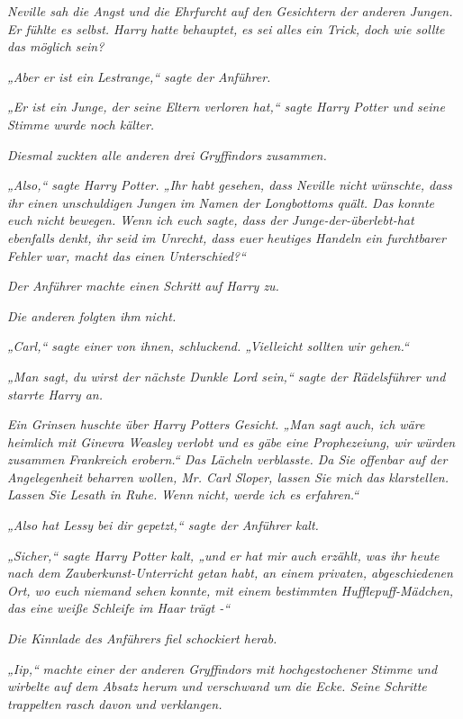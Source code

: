 {\emph{Neville sah die Angst und die Ehrfurcht auf den Gesichtern der anderen Jungen. Er fühlte es selbst. Harry hatte} \emph{\emph{behauptet,}} \emph{es sei alles ein Trick, doch wie sollte das möglich sein?}

\emph{„Aber er ist ein} \emph{\emph{Lestrange,}“ sagte der Anführer.}

\emph{„Er ist ein Junge, der} \emph{\emph{seine Eltern verloren hat,}“ sagte Harry Potter und seine} \emph{Stimme wurde noch kälter.}

\emph{Diesmal zuckten alle anderen drei Gryffindors zusammen.}

\emph{„Also,“ sagte Harry Potter. „Ihr habt gesehen, dass Neville nicht wünschte, dass ihr einen unschuldigen Jungen im Namen der Longbottoms quält. Das konnte euch nicht bewegen. Wenn ich euch sagte, dass der Junge-der-überlebt-hat} \emph{\emph{ebenfalls}} \emph{denkt, ihr} \emph{seid} \emph{im Unrecht, dass euer heutiges Handeln ein furchtbarer Fehler war, macht das einen Unterschied?“}

\emph{Der Anführer machte einen Schritt auf Harry zu.}

\emph{Die anderen folgten ihm} \emph{\emph{nicht.}}

\emph{„Carl,“ sagte einer von ihnen, schluckend. „Vielleicht sollten wir gehen.“}

\emph{„Man sagt, du wirst der nächste Dunkle Lord sein,“ sagte der Rädelsführer und starrte Harry an.}

\emph{Ein Grinsen huschte über Harry Potters Gesicht. „Man sagt auch, ich wäre heimlich mit Ginevra Weasley verlobt und es gäbe eine Prophezeiung, wir würden zusammen Frankreich erobern.“ Das Lächeln verblasste. Da Sie offenbar auf der Angelegenheit beharren wollen, Mr. Carl Sloper, lassen Sie mich} \emph{das} \emph{klarstellen.} \emph{\emph{Lassen Sie Lesath in Ruhe.}} \emph{Wenn nicht, werde ich es erfahren.“}

\emph{„Also hat Lessy bei dir gepetzt,“ sagte der Anführer kalt.}

\emph{„Sicher,“ sagte Harry Potter kalt, „und er hat mir auch erzählt, was ihr heute nach dem Zauberkunst-Unterricht getan habt, an einem privaten, abgeschiedenen Ort, wo euch niemand sehen konnte, mit einem bestimmten Hufflepuff-Mädchen, das eine weiße Schleife im Haar trägt -“}

\emph{Die Kinnlade des Anführers fiel schockiert herab.}

\emph{„Iip,“} \emph{machte} \emph{einer der anderen Gryffindors mit hochgestochener Stimme und wirbelte auf dem Absatz herum und verschwand um die Ecke. Seine Schritte trappelten rasch davon und verklangen.}

}
